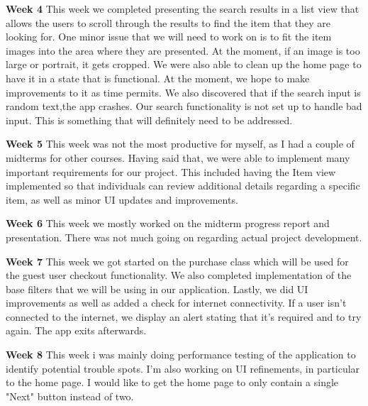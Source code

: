 \documentclass[journal,compsoc, 10pt, draftclsnofoot, onecolumn]{IEEEtran}
\begin{document}
\textbf{Week 4}\newline
This week we completed presenting the search results in a list view that allows the users to
scroll through the results to find the item that they are looking for. One minor issue that we
will need to work on is to fit the item images into the area where they are presented. At the
moment, if an image is too large or portrait, it gets cropped. We were also able to clean up
the home page to have it in a state that is functional. At the moment, we hope to make
improvements to it as time permits. We also discovered that if the search input is random
text,the
app crashes. Our search functionality is not set up to handle bad input. This is something
that will definitely need to be addressed.\newline

\textbf{Week 5}\newline
This week was not the most productive for myself, as I had a couple of midterms for other
courses. Having said that, we were able to implement many important requirements for our
project. This included having the Item view implemented so that individuals can review
additional details regarding a specific item, as well as minor UI updates and
improvements.\newline

\textbf{Week 6}\newline
This week we mostly worked on the midterm progress report and presentation. There was not much
going on regarding actual project development.\newline

\textbf{Week 7}\newline
This week we got started on the purchase class which will be used for the guest user checkout
functionality. We also completed implementation of the base filters that we will be using in
our application. Lastly, we did UI improvements as well as added a check for internet
connectivity. If a user isn't connected to the internet, we display an alert stating that it's
required and to try again. The app exits afterwards.\newline

\textbf{Week 8}\newline
This week i was mainly doing performance testing of the application to identify potential
trouble spots. I'm also working on UI refinements, in particular to the home page. I would like 
to get the home page to only contain a single "Next" button instead of two.\newline
\end{document}
